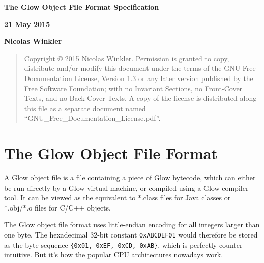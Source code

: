 \documentclass[12pt]{article}
\begin{document}
\begin{titlepage}
    \begin{center}
        \vspace*{1cm}
        {
            \Huge        
            \textbf{The Glow Object File Format Specification}
        }

        \vspace{0.7cm}
        
        
        \vspace{0.5cm}
        { \large
        \textbf{21 May 2015}}

        \vspace{1cm}

        { \Large
        \textbf{Nicolas Winkler}
        }
        \vfill

\bigskip
\begin{quote}
    Copyright \copyright{} 2015 Nicolas Winkler.
    Permission is granted to copy, distribute and/or modify this document
    under the terms of the GNU Free Documentation License, Version 1.3
    or any later version published by the Free Software Foundation;
    with no Invariant Sections, no Front-Cover Texts, and no Back-Cover Texts.
    A copy of the license is distributed along this file as a separate document 
    named ``GNU\_Free\_Documentation\_License.pdf''.
\end{quote}
\bigskip

        \vspace{1cm}
        
    \end{center}
\end{titlepage}

\setlength{\parindent}{0cm}
\setlength{\parskip}{0.2cm}

\section*{The Glow Object File Format}

A Glow object file is a file containing a piece of Glow bytecode, which
can either be run directly by a Glow virtual machine, or compiled using
a Glow compiler tool.
It can be viewed as the equivalent to *.class files for Java classes or
*.obj/*.o files for C/C++ objects.



The Glow object file format uses little-endian encoding for all integers
larger than one byte. The hexadecimal 32-bit constant \texttt{0xABCDEF01} would
therefore be stored as the byte sequence \texttt{\{0x01, 0xEF, 0xCD, 0xAB\}},
which is perfectly counter-intuitive. But it's how the popular CPU architectures
nowadays work.
\end{document}
